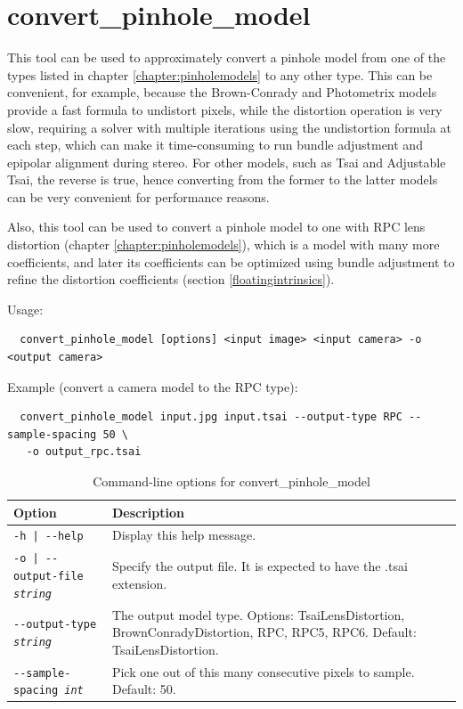 \section{convert\_pinhole\_model}
\label{convertpinholemodel}

This tool can be used to approximately convert a pinhole model from one
of the types listed in chapter \ref{chapter:pinholemodels} to any other
type. This can be convenient, for example, because the Brown-Conrady and Photometrix models
provide a fast formula to undistort pixels, while the distortion operation is very slow,
requiring a solver with multiple iterations using the undistortion formula at each step,
which can make it time-consuming to run bundle adjustment and epipolar alignment during stereo.
For other models, such as Tsai and Adjustable Tsai, the reverse is true, hence converting
from the former to the latter models can be very convenient for performance reasons. 

Also, this tool can be used to convert a pinhole model to one with RPC
lens distortion (chapter \ref{chapter:pinholemodels}), which is a model
with many more coefficients, and later its coefficients can be optimized
using bundle adjustment to refine the distortion coefficients (section \ref{floatingintrinsics}). 

Usage:
\begin{verbatim}
  convert_pinhole_model [options] <input image> <input camera> -o <output camera>
\end{verbatim}

Example (convert a camera model to the RPC type):

\begin{verbatim}
  convert_pinhole_model input.jpg input.tsai --output-type RPC --sample-spacing 50 \
   -o output_rpc.tsai
\end{verbatim}

\begin{longtable}{|l|p{7.5cm}|}
\caption{Command-line options for convert\_pinhole\_model}
\label{tbl:convertpinholemodel}
\endfirsthead
\endhead
\endfoot
\endlastfoot
\hline
Option & Description \\ \hline \hline
\texttt{-h | -\/-help } & Display this help message.\\ \hline

\texttt{-o | -\/-output-file \textit{string} } & Specify the output file. It is expected to have the .tsai extension. \\ \hline

\texttt{-\/-output-type \textit{string}} & The output model type. Options: TsaiLensDistortion, 
BrownConradyDistortion, RPC, RPC5, RPC6. Default: TsaiLensDistortion.\\ \hline

\texttt{-\/-sample-spacing \textit{int}} & Pick one out of this many
consecutive pixels to sample. Default: 50. \\ \hline

\end{longtable}

